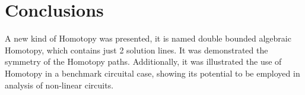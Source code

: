 \documentclass[conference,letterpaper,onecolumn]{IEEEtran}
\begin{document}
\begin{table}[hbtp]
{\tiny
{}
}
\caption{Punto de inicio  y final correspondiente a cada funcion multiparametrica ($B_1$, $B_2$ y $B_3$), considerando $\lambda_1=0.5$ and $\lambda_2=0$. }
\label{yamamuracircuitosoluc}
\end{table}





\section{Conclusions}

A new kind of Homotopy was presented, it is named double bounded algebraic Homotopy, which contains just 2 solution lines. It was demonstrated the symmetry of the Homotopy paths. 
Additionally, it was illustrated the use of Homotopy in a benchmark circuital case, showing its potential to be employed in analysis of non-linear circuits.



\end{document}
